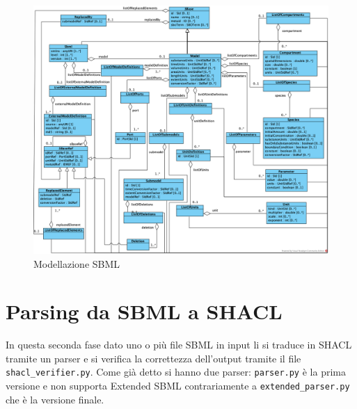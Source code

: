 \documentclass{article}
\begin{document}




\begin{figure}
    \caption{Modellazione SBML}
    \label{fig:diagram}
    \includegraphics[scale=0.6]{images/diagram.png}
\end{figure}

\clearpage
\section{Parsing da SBML a SHACL}

In questa seconda fase dato uno o più file SBML in input li si traduce in SHACL tramite un parser e si verifica la correttezza dell'output tramite il file \texttt{shacl\_verifier.py}. Come già detto si hanno due parser: \texttt{parser.py} è la prima versione e non supporta Extended SBML contrariamente a \texttt{extended\_parser.py} che è la versione finale. 
\end{document}
